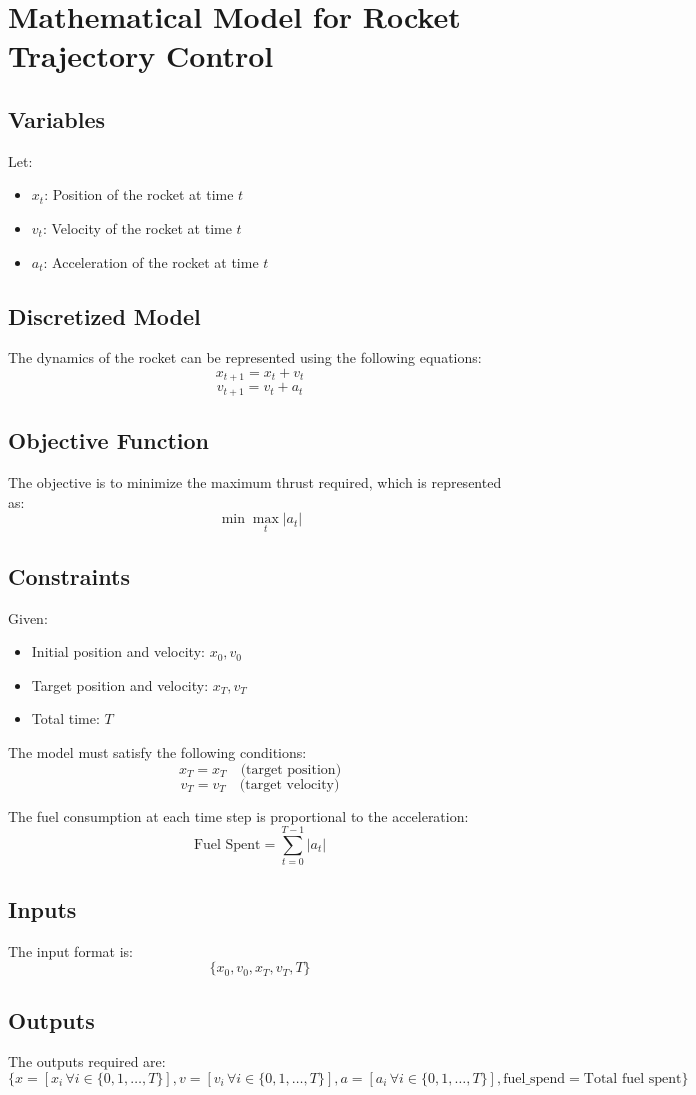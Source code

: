 \documentclass{article}
\begin{document}
\section*{Mathematical Model for Rocket Trajectory Control}

\subsection*{Variables}
Let:
\begin{itemize}
    \item \( x_t \): Position of the rocket at time \( t \)
    \item \( v_t \): Velocity of the rocket at time \( t \)
    \item \( a_t \): Acceleration of the rocket at time \( t \)
\end{itemize}

\subsection*{Discretized Model}
The dynamics of the rocket can be represented using the following equations:
\[
x_{t+1} = x_t + v_t
\]
\[
v_{t+1} = v_t + a_t
\]

\subsection*{Objective Function}
The objective is to minimize the maximum thrust required, which is represented as:
\[
\min \max_t |a_t|
\]

\subsection*{Constraints}
Given:
\begin{itemize}
    \item Initial position and velocity: \( x_0, v_0 \)
    \item Target position and velocity: \( x_T, v_T \)
    \item Total time: \( T \)
\end{itemize}

The model must satisfy the following conditions:
\[
x_T = x_T \quad \text{(target position)}
\]
\[
v_T = v_T \quad \text{(target velocity)}
\]

The fuel consumption at each time step is proportional to the acceleration:
\[
\text{Fuel Spent} = \sum_{t=0}^{T-1} |a_t|
\]

\subsection*{Inputs}
The input format is:
\[
\{ 
    x_0, 
    v_0, 
    x_T, 
    v_T, 
    T 
\}
\]

\subsection*{Outputs}
The outputs required are:
\[
\{ 
    x = [x_i \, \forall i \in \{0, 1, \ldots, T\}], 
    v = [v_i \, \forall i \in \{0, 1, \ldots, T\}], 
    a = [a_i \, \forall i \in \{0, 1, \ldots, T\}], 
    \text{fuel\_spend} = \text{Total fuel spent} 
\}
\]
\end{document}
